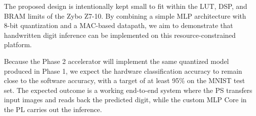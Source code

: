 \documentclass[12pt, letterpaper]{article}
\begin{document}
The proposed design is intentionally kept small to fit within the LUT, DSP, and BRAM limits of the Zybo Z7-10. By combining a simple
MLP architecture with 8-bit quantization and a MAC-based datapath, we aim to demonstrate that handwritten digit inference can be
implemented on this resource-constrained platform.

Because the Phase 2 accelerator will implement the same quantized model produced in Phase 1, we expect the hardware classification
accuracy to remain close to the software accuracy, with a target of at least 95\% on the MNIST test set. The expected outcome is a
working end-to-end system where the PS transfers input images and reads back the predicted digit, while the custom MLP Core in the
PL carries out the inference.
\end{document}

